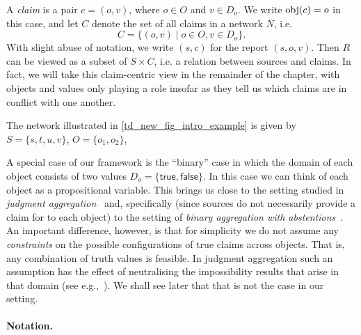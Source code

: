 A \emph{claim} is a pair $c = (o, v)$, where $o \in O$ and $v \in D_o$. We
write $\operatorname{obj}(c) = o$ in this case, and let $C$ denote the set of all claims in a
network $N$, i.e.
\[
    C = \{(o, v) \mid o \in O, v \in D_o\}.
\]
With slight abuse of notation, we write $(s, c)$ for the report $(s, o, v)$.
Then $R$ can be viewed as a subset of $S \times C$, i.e. a relation between
sources and claims. In fact, we will take this claim-centric view in the
remainder of the chapter, with objects and values only playing a role insofar as
they tell us which claims are in conflict with one another.

\begin{example}
    The network illustrated in \cref{td_new_fig_intro_example} is given by $S =
    \{s, t, u, v\}$, $O = \{o_1, o_2\}$, 
\end{example}

A special case of our framework is the ``binary'' case in which the domain of
each object consists of two values $D_o = \{\mathsf{true}, \mathsf{false}\}$.
In this case we can think of each object as a propositional variable. This
brings us close to the setting studied in \emph{judgment
aggregation}~\cite{endriss2016ja} and, specifically (since sources do not
necessarily provide a claim for to each object) to the setting of \emph{binary
aggregation with abstentions}~\cite{christoffbinary,dokow}. An important
difference, however, is that for simplicity we do not assume any
\emph{constraints} on the possible configurations of true claims across
objects. That is, any combination of truth values is feasible. In judgment
aggregation such an assumption has the effect of neutralising the impossibility
results that arise in that domain (see e.g.,~\cite{christoffbinary}). We shall
see later that that is not the case in our setting.

\paragraph{Notation.}

